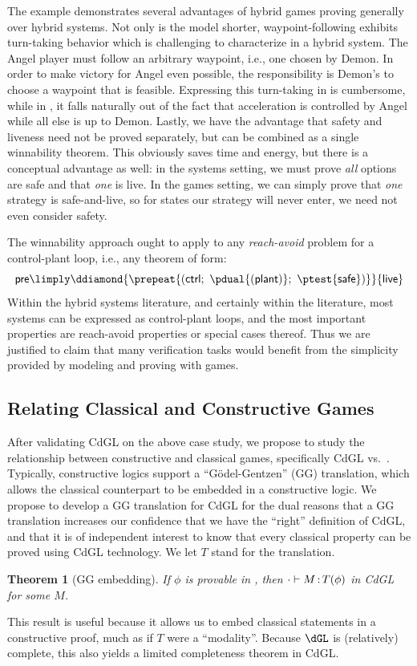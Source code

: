 \documentclass[12pt]{cmuthesis}
\newtheorem{theorem}{Theorem}
\theoremstyle{definition}
\theoremstyle{remark}
\newcommand{\ctrl}{\textsf{ctrl}\xspace}
\newcommand{\plant}{\textsf{plant}\xspace}
\newcommand{\rref}[2][]{\prettyref{#2}}
\newcommand{\CdGL}{\textsf{CdGL}\xspace}
\begin{document}
The example demonstrates several advantages of hybrid games proving generally over hybrid systems.
Not only is the model shorter, waypoint-following exhibits turn-taking behavior which is challenging to characterize in a hybrid system.
The Angel player must follow an arbitrary waypoint, i.e., one chosen by Demon.
In order to make victory for Angel even possible, the responsibility is Demon's to choose a waypoint that is feasible.
Expressing this turn-taking in \rref{thm:liveness} is cumbersome, while in \rref{thm:angel-wins-gen}, it falls naturally out of the fact that acceleration is controlled by Angel while all else is up to Demon.
Lastly, we have the advantage that safety and liveness need not be proved separately, but can be combined as a single winnability theorem.
This obviously saves time and energy, but there is a conceptual advantage as well: in the systems setting, we must prove \emph{all} options are safe and that \emph{one} is live.
In the games setting, we can simply prove that \emph{one} strategy is safe-and-live, so for states our strategy will never enter, we need not even consider safety.

The winnability approach ought to apply to any \emph{reach-avoid} problem for a control-plant loop, i.e., any theorem of form:
\[\textsf{pre} \limply \ddiamond{\prepeat{(\ctrl;~\pdual{(\plant)};~\ptest{\textsf{safe}})}}{\textsf{live}}\]
Within the hybrid systems literature, and certainly within the \dL literature, most systems can be expressed as control-plant loops, and the most important properties are reach-avoid properties or special cases thereof.
Thus we are justified to claim that many verification tasks would benefit from the simplicity provided by modeling and proving with games.

\subsection{Relating Classical and Constructive Games}
After validating \CdGL on the above case study, we propose to study the relationship between constructive and classical games, specifically \CdGL vs.\ \dGL.
Typically, constructive logics support a ``G\"{o}del-Gentzen'' (GG) translation, which allows the classical counterpart to be embedded in a constructive logic.
We propose to develop a GG translation for \CdGL for the dual reasons that a GG translation increases our confidence that we have the ``right'' definition of \CdGL, and that it is of independent interest to know that every classical \dGL property can be proved using \CdGL technology.
We let $T$ stand for the translation.
\begin{theorem}[GG embedding]
  If $\phi$ is provable in \dGL, then $\cdot\allowbreak\vdash M \allowbreak \mathop{:} T(\phi)$ in \CdGL for some $M$.
\end{theorem}
This result is useful because it allows us to embed classical statements in a constructive proof, much as if $T$ were a ``modality''.
Because $\dGL$ is (relatively) complete, this also yields a limited completeness theorem in \CdGL.
\end{document}
